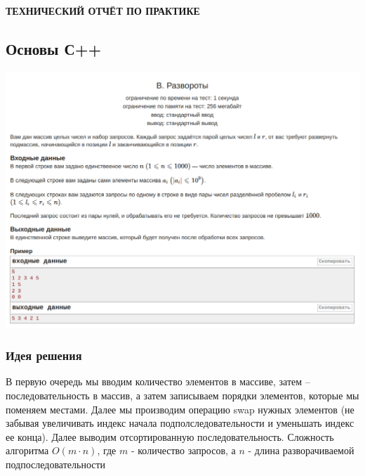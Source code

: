 
\begin{center}
\bfseries{\large ТЕХНИЧЕСКИЙ ОТЧЁТ ПО ПРАКТИКЕ}
\end{center}


\subsection*{Основы С++}
\begin{center}
\includegraphics[width=\textwidth]{statements/Contest1B.png}
\end{center}

\subsubsection*{Идея решения}

В первую очередь мы вводим количество элементов в массиве, затем – последовательность в массив, а затем записываем порядки элементов, которые мы поменяем местами.
Далее мы производим операцию swap нужных элементов (не забывая увеличивать индекс начала подполследовательности и уменьшать индекс ее конца). Далее выводим отсортированную последовательность.
Сложность алгоритма $O(m \cdot n)$, где $m$ - количество запросов, а $n$ - длина разворачиваемой подпоследовательности

